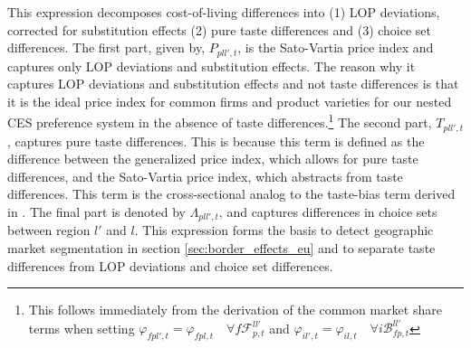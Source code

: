 This expression decomposes cost-of-living differences into (1) LOP deviations, corrected for substitution effects (2) pure taste differences and (3) choice set differences. The first part, given by, $P_{pll',t}$, is the Sato-Vartia price index and captures only LOP deviations and substitution effects. The reason why it captures LOP deviations and substitution effects and not taste differences is that it is the ideal price index for common firms and product varieties for our nested CES preference system in the absence of taste differences.\footnote{This follows immediately from the derivation of the common market share terms when setting $\varphi_{fpl',t} = \varphi_{fpl,t} \quad \forall f \mathcal{F}^{ll'}_{p,t}$ and $\varphi_{il',t} = \varphi_{il,t} \quad \forall i \mathcal{B}^{ll'}_{fp,t}$} The second part, $T_{pll',t}$, captures pure taste differences. This is because this term is defined as the difference between the generalized price index, which allows for pure taste differences, and the Sato-Vartia price index, which abstracts from taste differences. This term is the cross-sectional analog to the taste-bias term derived in \citet{Redding2020}. The final part is denoted by $\Lambda_{pll',t}$, and captures differences in choice sets between region $l'$ and $l$. This expression forms the basis to detect geographic market segmentation in section \ref{sec:border_effects_eu} and to separate taste differences from LOP deviations and choice set differences.

